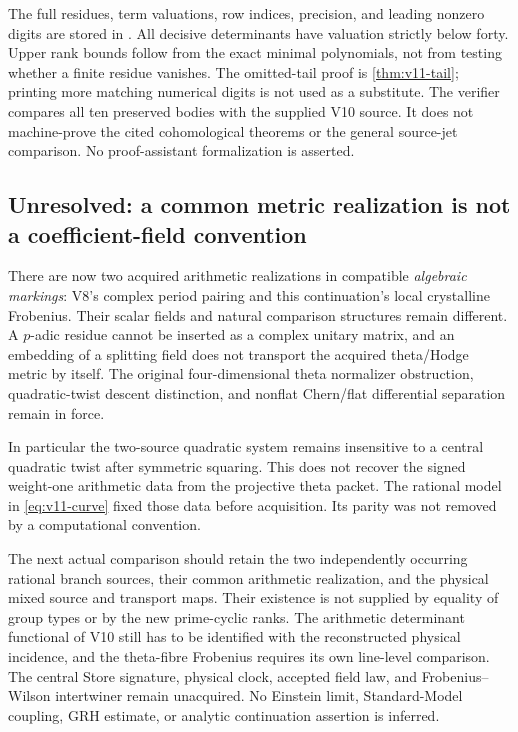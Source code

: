 \documentclass[11pt]{article}
\theoremstyle{definition}
\theoremstyle{remark}
\begin{document}
The full residues, term valuations, row indices, precision, and leading
nonzero digits are stored in
.
All decisive determinants have valuation strictly below forty. Upper
rank bounds follow from the exact minimal polynomials, not from testing
whether a finite residue vanishes. The omitted-tail proof is
\cref{thm:v11-tail}; printing more matching numerical digits is not
used as a substitute. The verifier compares all ten preserved bodies
with the supplied V10 source. It does not machine-prove the cited
cohomological theorems or the general source-jet comparison. No
proof-assistant formalization is asserted.

\subsection{Unresolved: a common metric realization is not a coefficient-field convention}
There are now two acquired arithmetic realizations in compatible
\emph{algebraic markings}: V8's complex period pairing and this
continuation's local crystalline Frobenius. Their scalar fields and
natural comparison structures remain different. A $p$-adic residue
cannot be inserted as a complex unitary matrix, and an embedding of a
splitting field does not transport the acquired theta/Hodge metric by
itself. The original four-dimensional theta normalizer obstruction,
quadratic-twist descent distinction, and nonflat Chern/flat differential
separation remain in force.

In particular the two-source quadratic system remains insensitive to a
central quadratic twist after symmetric squaring. This does not recover
the signed weight-one arithmetic data from the projective theta packet.
The rational model in \cref{eq:v11-curve} fixed those data before
acquisition. Its parity was not removed by a computational convention.

The next actual comparison should retain the two independently occurring
rational branch sources, their common arithmetic realization, and the
physical mixed source and transport maps. Their existence is not supplied
by equality of group types or by the new prime-cyclic ranks. The
arithmetic determinant functional of V10 still has to be identified
with the reconstructed physical incidence, and the theta-fibre
Frobenius requires its own line-level comparison. The central Store
signature, physical clock, accepted field law, and Frobenius--Wilson
intertwiner remain unacquired. No Einstein limit, Standard-Model
coupling, GRH estimate, or analytic continuation assertion is inferred.
\end{document}
